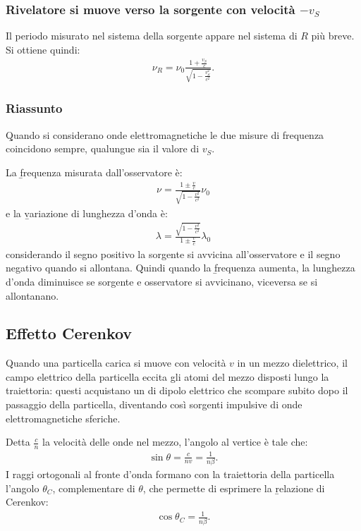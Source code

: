 \subsubsection{Rivelatore si muove verso la sorgente con velocità $-v_S$}
Il periodo misurato nel sistema della sorgente appare nel sistema di $R$ più breve. Si ottiene quindi:
\begin{equation}\begin{split}
\nu_R=\nu_0\frac{1+\frac{v_S}{c}}{\sqrt{1-\frac{v_S^2}{c^2}}}.
\end{split}\end{equation}

\subsubsection{Riassunto}
\b{Quando si considerano onde elettromagnetiche le due misure di frequenza coincidono sempre, qualungue sia il valore di $v_S$}.

La \b{frequenza misurata dall'osservatore} è:
\begin{equation}\begin{split}
\nu=\frac{1\pm\frac{v}{c}}{\sqrt{1-\frac{v^2}{c^2}}}\nu_0
\end{split}\end{equation}
e la \b{variazione di lunghezza d'onda} è:
\begin{equation}\begin{split}
\lambda=\frac{\sqrt{1-\frac{v^2}{c^2}}}{1\pm\frac{v}{c}}\lambda_0
\end{split}\end{equation}
considerando il segno positivo la sorgente si avvicina all'osservatore e il segno negativo quando si allontana. Quindi quando la \b{frequenza aumenta, la lunghezza d'onda diminuisce se sorgente e osservatore si avvicinano, viceversa se si allontanano}.

\subsection{Effetto Cerenkov}
Quando una particella carica si muove con velocità $v$ in un mezzo dielettrico, il campo elettrico della particella eccita gli atomi del mezzo disposti lungo la traiettoria: questi acquistano un \mom di dipolo elettrico che scompare subito dopo il passaggio della particella, diventando così sorgenti impulsive di onde elettromagnetiche sferiche.

Detta $\frac{c}{n}$ la velocità delle onde nel mezzo, l'angolo al vertice è tale che:
\begin{equation}\begin{split}
\sin{\theta}=\frac{c}{nv}=\frac{1}{n\beta}.
\end{split}\end{equation}
I raggi ortogonali al fronte d'onda formano con la traiettoria della particella l'angolo $\theta_C$, complementare di $\theta$, che permette di esprimere la \b{relazione di Cerenkov}:
\begin{equation}\begin{split}
\cos{\theta_C}=\frac{1}{n\beta}.
\end{split}\end{equation}

